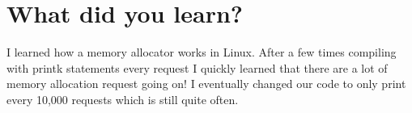 \documentclass[letterpaper,10pt,notitlepage,fleqn]{article}
\begin{document}
\section*{What did you learn?}
    I learned how a memory allocator works in Linux. After a few times compiling 
    with printk statements every request I quickly learned that there are a lot of 
    memory allocation request going on! I eventually changed our code to only print 
    every 10,000 requests which is still quite often. 
    
\end{document}
